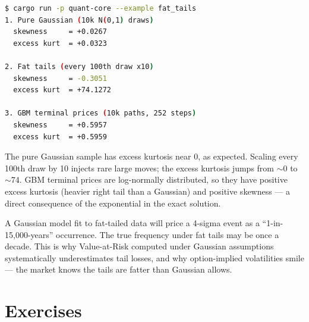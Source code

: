 
\begin{lstlisting}[language=bash]
$ cargo run -p quant-core --example fat_tails
1. Pure Gaussian (10k N(0,1) draws)
  skewness     = +0.0267
  excess kurt  = +0.0323

2. Fat tails (every 100th draw x10)
  skewness     = -0.3051
  excess kurt  = +74.1272

3. GBM terminal prices (10k paths, 252 steps)
  skewness     = +0.5957
  excess kurt  = +0.5959
\end{lstlisting}

The pure Gaussian sample has excess kurtosis near $0$, as expected. Scaling
every 100th draw by 10 injects rare large moves; the excess kurtosis jumps
from $\sim 0$ to $\sim 74$. GBM terminal prices are log-normally
distributed, so they have positive excess kurtosis (heavier right tail than
a Gaussian) and positive skewness --- a direct consequence of the
exponential in the exact solution.

\begin{keyinsight}
A Gaussian model fit to fat-tailed data will price a 4-sigma event as a
``1-in-15,000-years'' occurrence. The true frequency under fat tails may be
once a decade. This is why Value-at-Risk computed under Gaussian assumptions
systematically underestimates tail losses, and why option-implied volatilities
smile --- the market knows the tails are fatter than Gaussian allows.
\end{keyinsight}

\section{Exercises}

